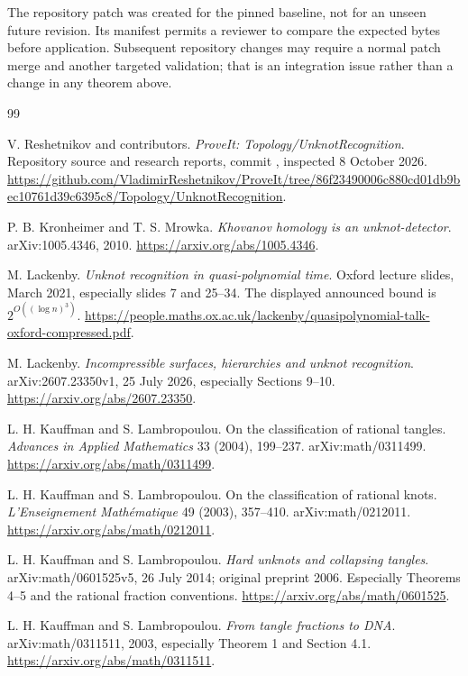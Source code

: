 The repository patch was created for the pinned baseline, not for an
unseen future revision. Its manifest permits a reviewer to compare the
expected bytes before application. Subsequent repository changes may
require a normal patch merge and another targeted validation; that is
an integration issue rather than a change in any theorem above.

\begin{thebibliography}{99}
\small\raggedright

V. Reshetnikov and contributors.
\emph{ProveIt: Topology/UnknotRecognition}.
Repository source and research reports, commit
,
inspected 8 October 2026.
\url{https://github.com/VladimirReshetnikov/ProveIt/tree/86f23490006c880cd01db9bec10761d39c6395c8/Topology/UnknotRecognition}.

P. B. Kronheimer and T. S. Mrowka.
\emph{Khovanov homology is an unknot-detector}.
arXiv:1005.4346, 2010.
\url{https://arxiv.org/abs/1005.4346}.

M. Lackenby.
\emph{Unknot recognition in quasi-polynomial time}.
Oxford lecture slides, March 2021, especially slides 7 and 25--34.
The displayed announced bound is \(2^{O((\log n)^3)}\).
\url{https://people.maths.ox.ac.uk/lackenby/quasipolynomial-talk-oxford-compressed.pdf}.

M. Lackenby.
\emph{Incompressible surfaces, hierarchies and unknot recognition}.
arXiv:2607.23350v1, 25 July 2026, especially Sections 9--10.
\url{https://arxiv.org/abs/2607.23350}.

L. H. Kauffman and S. Lambropoulou.
On the classification of rational tangles.
\emph{Advances in Applied Mathematics} 33 (2004), 199--237.
arXiv:math/0311499.
\url{https://arxiv.org/abs/math/0311499}.

L. H. Kauffman and S. Lambropoulou.
On the classification of rational knots.
\emph{L'Enseignement Math\'ematique} 49 (2003), 357--410.
arXiv:math/0212011.
\url{https://arxiv.org/abs/math/0212011}.

L. H. Kauffman and S. Lambropoulou.
\emph{Hard unknots and collapsing tangles}.
arXiv:math/0601525v5, 26 July 2014; original preprint 2006.
Especially Theorems 4--5 and the rational fraction conventions.
\url{https://arxiv.org/abs/math/0601525}.

L. H. Kauffman and S. Lambropoulou.
\emph{From tangle fractions to DNA}.
arXiv:math/0311511, 2003, especially Theorem 1 and Section 4.1.
\url{https://arxiv.org/abs/math/0311511}.


\end{thebibliography}
